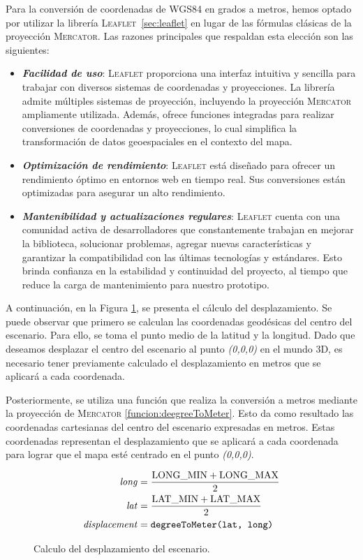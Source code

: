 \documentclass[a4paper, 11pt]{book}
\begin{document}
Para la conversión de coordenadas de \textsc{WGS84} en grados a metros, hemos optado por utilizar la librería \textsc{Leaflet}~\ref{sec:leaflet} en lugar de las fórmulas clásicas de la proyección \textsc{Mercator}. Las razones principales que respaldan esta elección son las siguientes:
\begin{itemize}
    \item \textbf{\emph{Facilidad de uso}}: \textsc{Leaflet} proporciona una interfaz intuitiva y sencilla para trabajar con diversos sistemas de coordenadas y proyecciones. La librería admite múltiples sistemas de proyección, incluyendo la proyección \textsc{Mercator} ampliamente utilizada. 
    Además, ofrece funciones integradas para realizar conversiones de coordenadas y proyecciones, lo cual simplifica la transformación de datos geoespaciales en el contexto del mapa.
    \item \textbf{\emph{Optimización de rendimiento}}: \textsc{Leaflet} está diseñado para ofrecer un rendimiento óptimo en entornos web en tiempo real. Sus conversiones están optimizadas para asegurar un alto rendimiento.
    \item \textbf{\emph{Mantenibilidad y actualizaciones regulares}}: \textsc{Leaflet} cuenta con una comunidad activa de desarrolladores que constantemente trabajan en mejorar la biblioteca, solucionar problemas, agregar nuevas características y garantizar la compatibilidad con las últimas tecnologías y estándares. Esto brinda confianza en la estabilidad y continuidad del proyecto, al tiempo que reduce la carga de mantenimiento para nuestro prototipo.
\end{itemize}
A continuación, en la Figura \ref{formula:desplazamiento}, se presenta el cálculo del desplazamiento. Se puede observar que primero se calculan las coordenadas geodésicas del centro del escenario. Para ello, se toma el punto medio de la latitud y la longitud. Dado que deseamos desplazar el centro del escenario al punto \emph{(0,0,0)} en el mundo \textsc{3D}, es necesario tener previamente calculado el desplazamiento en metros que se aplicará a cada coordenada.

Posteriormente, se utiliza una función que realiza la conversión a metros mediante la proyección de \textsc{Mercator} \ref{funcion:deegreeToMeter}. Esto da como resultado las coordenadas cartesianas del centro del escenario expresadas en metros. Estas coordenadas representan el desplazamiento que se aplicará a cada coordenada para lograr que el mapa esté centrado en el punto \emph{(0,0,0)}.
\begin{figure}[h]
\begin{align*}
\text{\emph{long}} &= \frac{{\text{LONG\_MIN} + \text{LONG\_MAX}}}{2} \\
\text{\emph{lat}} &= \frac{{\text{LAT\_MIN} + \text{LAT\_MAX}}}{2} \\
\text{\emph{displacement}} &= \texttt{\text{degreeToMeter}(\text{lat}, \text{long})}
\end{align*}
\caption{Calculo del desplazamiento del escenario.}
  \label{formula:desplazamiento}
\end{figure}
\end{document}
